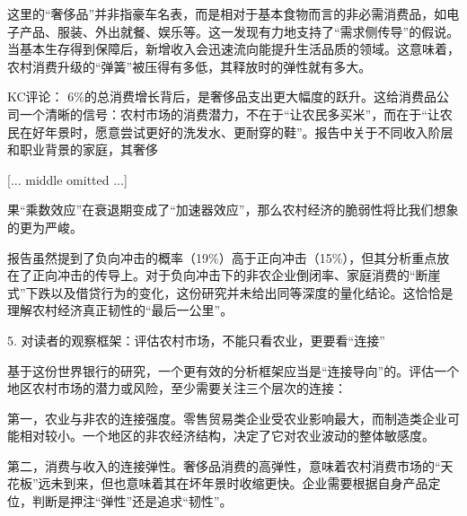 \documentclass[11pt]{ctexart}
\begin{document}
这里的“奢侈品”并非指豪车名表，而是相对于基本食物而言的非必需消费品，如电子产品、服装、外出就餐、娱乐等。这一发现有力地支持了“需求侧传导”的假说。当基本生存得到保障后，新增收入会迅速流向能提升生活品质的领域。这意味着，农村消费升级的“弹簧”被压得有多低，其释放时的弹性就有多大。

KC评论： 6\%的总消费增长背后，是奢侈品支出更大幅度的跃升。这给消费品公司一个清晰的信号：农村市场的消费潜力，不在于“让农民多买米”，而在于“让农民在好年景时，愿意尝试更好的洗发水、更耐穿的鞋”。报告中关于不同收入阶层和职业背景的家庭，其奢侈

[... middle omitted ...]

果“乘数效应”在衰退期变成了“加速器效应”，那么农村经济的脆弱性将比我们想象的更为严峻。

报告虽然提到了负向冲击的概率（19\%）高于正向冲击（15\%），但其分析重点放在了正向冲击的传导上。对于负向冲击下的非农企业倒闭率、家庭消费的“断崖式”下跌以及借贷行为的变化，这份研究并未给出同等深度的量化结论。这恰恰是理解农村经济真正韧性的“最后一公里”。

5. 对读者的观察框架：评估农村市场，不能只看农业，更要看“连接”

基于这份世界银行的研究，一个更有效的分析框架应当是“连接导向”的。评估一个地区农村市场的潜力或风险，至少需要关注三个层次的连接：

第一，农业与非农的连接强度。零售贸易类企业受农业影响最大，而制造类企业可能相对较小。一个地区的非农经济结构，决定了它对农业波动的整体敏感度。

第二，消费与收入的连接弹性。奢侈品消费的高弹性，意味着农村消费市场的“天花板”远未到来，但也意味着其在坏年景时收缩更快。企业需要根据自身产品定位，判断是押注“弹性”还是追求“韧性”。
\end{document}
